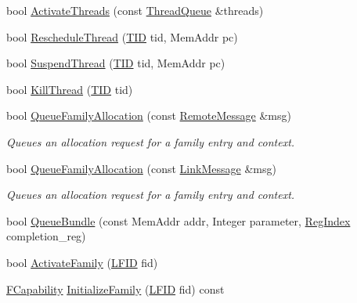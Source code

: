 \begin{DoxyCompactItemize}
\item 
bool \hyperlink{class_simulator_1_1drisc_1_1_allocator_ab37142b9fee9d512f024f5c9ee63894a}{Activate\+Threads} (const \hyperlink{struct_simulator_1_1_thread_queue}{Thread\+Queue} \&threads)
\item 
bool \hyperlink{class_simulator_1_1drisc_1_1_allocator_a169cdbc4e190eda02b915d4e24759d45}{Reschedule\+Thread} (\hyperlink{namespace_simulator_a483cc4ecee1736e895054617672cded5}{T\+I\+D} tid, Mem\+Addr pc)
\item 
bool \hyperlink{class_simulator_1_1drisc_1_1_allocator_ac37fd4bebd3e003d525b983140528ce5}{Suspend\+Thread} (\hyperlink{namespace_simulator_a483cc4ecee1736e895054617672cded5}{T\+I\+D} tid, Mem\+Addr pc)
\item 
bool \hyperlink{class_simulator_1_1drisc_1_1_allocator_adaf39753f5a0ae3ba3050fee1de3aa41}{Kill\+Thread} (\hyperlink{namespace_simulator_a483cc4ecee1736e895054617672cded5}{T\+I\+D} tid)
\item 
bool \hyperlink{class_simulator_1_1drisc_1_1_allocator_a721030070ec8451b5a794d102c5b4fa0}{Queue\+Family\+Allocation} (const \hyperlink{struct_simulator_1_1drisc_1_1_remote_message}{Remote\+Message} \&msg)
\begin{DoxyCompactList}\small\item\em Queues an allocation request for a family entry and context. \end{DoxyCompactList}\item 
bool \hyperlink{class_simulator_1_1drisc_1_1_allocator_a5e7f3b0f99ca7882ad297626103ddd14}{Queue\+Family\+Allocation} (const \hyperlink{struct_simulator_1_1drisc_1_1_link_message}{Link\+Message} \&msg)
\begin{DoxyCompactList}\small\item\em Queues an allocation request for a family entry and context. \end{DoxyCompactList}\item 
bool \hyperlink{class_simulator_1_1drisc_1_1_allocator_ab9bd6c2ae162cbab2dece0cd4c06eacf}{Queue\+Bundle} (const Mem\+Addr addr, Integer parameter, \hyperlink{namespace_simulator_ab00c9033de4c9a17db7b53d6c292515c}{Reg\+Index} completion\+\_\+reg)
\item 
bool \hyperlink{class_simulator_1_1drisc_1_1_allocator_ab17d88c621263b976463b25146d4b17a}{Activate\+Family} (\hyperlink{namespace_simulator_aaccbc706b2d6c99085f52f6dfc2333e4}{L\+F\+I\+D} fid)
\item 
\hyperlink{namespace_simulator_a607aa9969bfe2711861ae21f42c37c59}{F\+Capability} \hyperlink{class_simulator_1_1drisc_1_1_allocator_a8867a1502dbe6e7f09b83ab11a29e579}{Initialize\+Family} (\hyperlink{namespace_simulator_aaccbc706b2d6c99085f52f6dfc2333e4}{L\+F\+I\+D} fid) const 

\end{DoxyCompactItemize}
